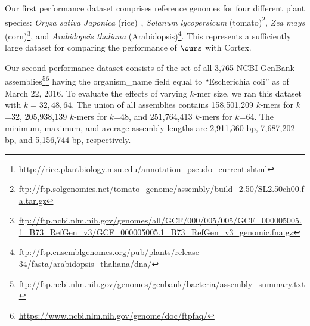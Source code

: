 \documentclass[doctor]{thesis}
\begin{document}
    Our first performance dataset comprises reference genomes for four different plant species:
    \emph{Oryza sativa Japonica} (rice)\footnote{\url{http://rice.plantbiology.msu.edu/annotation_pseudo_current.shtml}}\citep{rice},
    \emph{Solanum lycopersicum} (tomato)\footnote{\url{ftp://ftp.solgenomics.net/tomato_genome/assembly/build_2.50/SL2.50ch00.fa.tar.gz}}\citep{tomato1,tomato2},
    \emph{Zea mays} (corn)\footnote{\url{ftp://ftp.ncbi.nlm.nih.gov/genomes/all/GCF/000/005/005/GCF_000005005.1_B73_RefGen_v3/GCF_000005005.1_B73_RefGen_v3_genomic.fna.gz}}\citep{corn}, and
    \emph{Arabidopsis thaliana} (Arabidopsis)\footnote{\url{ftp://ftp.ensemblgenomes.org/pub/plants/release-34/fasta/arabidopsis_thaliana/dna/}}\citep{swarbreck}.
    This represents a sufficiently large dataset for comparing the performance of $\ours$ with {\sc Cortex}.  


Our second performance dataset consists of the set of all 3,765  NCBI GenBank assemblies\footnote{\url{ftp://ftp.ncbi.nlm.nih.gov/genomes/genbank/bacteria/assembly_summary.txt}}\footnote{\url{https://www.ncbi.nlm.nih.gov/genome/doc/ftpfaq/}} having the organism\_name field equal to ``Escherichia coli'' as of March 22, 2016.  To evaluate the effects of varying $k$-mer size, we ran this dataset with $k={32,48,64}$.  The union of all assemblies contains 158,501,209 $k$-mers for $k$=32, 205,938,139 $k$-mers for $k$=48, and 251,764,413 $k$-mers for $k$=64.  The minimum, maximum, and average assembly lengths are 2,911,360 bp, 7,687,202 bp, and 5,156,744 bp, respectively.
\end{document}

